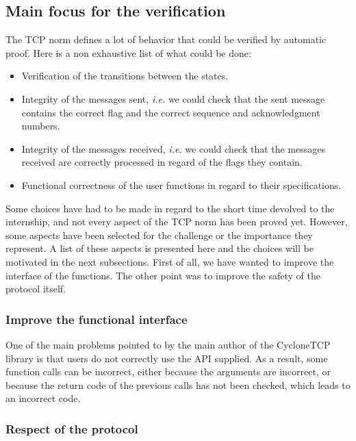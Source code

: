 \documentclass[a4paper, 10pt]{article}
\begin{document}
    \subsection{Main focus for the verification}

    The TCP norm defines a lot of behavior that could be verified by automatic proof.
    Here is a non exhaustive list of what could be done:
    \begin{itemize}
        \item Verification of the transitions between the states.
        \item Integrity of the messages sent, \textit{i.e.} we could check that the sent
        message contains the correct flag and the correct sequence and acknowledgment numbers.
        \item Integrity of the messages received, \textit{i.e.} we could check that the
        messages received are correctly processed in regard of the flags they contain.
        \item Functional correctness of the user functions in regard to their specifications.
    \end{itemize}

    Some choices have had to be made in regard to the short time devolved to the internship, and
    not every aspect of the TCP norm has been proved yet. However, some aspects have been selected
    for the challenge or the importance they represent. A list of these aspects is presented
    here and the choices will be motivated in the next subsections. First of all, we have wanted
    to improve the interface of the functions. The other point was to improve the safety of the
    protocol itself.

    \subsubsection{Improve the functional interface}

    One of the main problems pointed to by the main author of the CycloneTCP library is that users
    do not correctly use the API supplied. As a result, some function
    calls can be incorrect, either because the arguments are incorrect, or because the
    return code of the previous calls has not been checked, which leads to an
    incorrect code.

    \subsubsection{Respect of the protocol}
\end{document}
